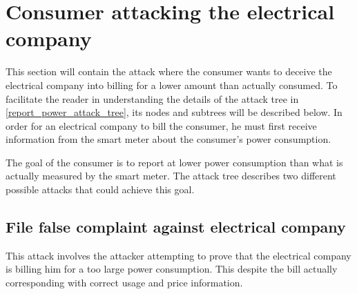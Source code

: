 
\section{Consumer attacking the electrical company}\label{attacks:consumer_vs_electrical}
This section will contain the attack where the consumer wants to deceive the electrical company into billing for a lower amount than actually consumed.
To facilitate the reader in understanding the details of the attack tree in \cref{report_power_attack_tree}, its nodes and subtrees will be described below.
In order for an electrical company to bill the consumer, he must first receive information from the smart meter about the consumer's power consumption.

The goal of the consumer is to report at lower power consumption than what is actually measured by the smart meter.
The attack tree describes two different possible attacks that could achieve this goal.



\subsection{File false complaint against electrical company}
This attack involves the attacker attempting to prove that the electrical company is billing him for a too large power consumption.
This despite the bill actually corresponding with correct usage and price information.

